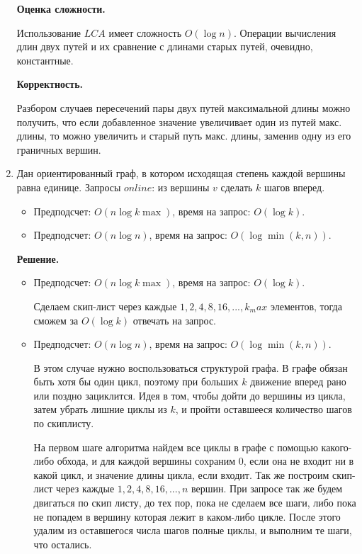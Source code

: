 \begin{enumerate}
	\textbf{Оценка сложности.} 
	
	Использование $LCA$ имеет сложность $O(\log n)$. Операции вычисления длин двух путей и их 
	сравнение с длинами старых путей, очевидно, константные.
	
	\textbf{Корректность.} 
	
	Разбором случаев пересечений пары двух путей максимальной длины можно получить, что если
	добавленное значение увеличивает один из путей макс. длины, то можно увеличить и старый путь макс.
	длины, заменив одну из его граничных вершин. 
	
	\item Дан ориентированный граф, в котором исходящая степень каждой вершины равна единице.
	Запросы $online$: из вершины $v$ сделать $k$ шагов вперед.
	\begin{itemize}
		\item Предподсчет: $O(n \log k\max)$, время на запрос: $O(\log k)$.
		\item Предподсчет: $O(n \log n)$, время на запрос: $O(\log \min(k, n))$.
	\end{itemize}
	
	\textbf{Решение.}
	
	\begin{itemize}
		\item Предподсчет: $O(n \log k\max)$, время на запрос: $O(\log k)$.
		
		Сделаем скип-лист через каждые $1, 2, 4, 8, 16, ..., k_max$ элементов, тогда сможем за $O(\log k)$ 
		отвечать на запрос.
		\item Предподсчет: $O(n \log n)$, время на запрос: $O(\log \min(k, n))$.
		
		В этом случае нужно воспользоваться структурой графа. В графе обязан быть хотя бы один 
		цикл, поэтому при больших $k$ движение вперед рано или поздно зациклится. Идея в том, 
		чтобы дойти до вершины из цикла, затем убрать лишние циклы из $k$, и пройти оставшееся 
		количество шагов по скиплисту.
		
		На первом шаге алгоритма найдем все циклы в графе с помощью какого-либо обхода, и для 
		каждой вершины сохраним 0, если она не входит ни в какой цикл, и значение длины цикла, 
		если входит. Так же построим скип-лист через каждые $1, 2, 4, 8, 16, ..., n$ вершин. 
		При запросе так же будем двигаться по скип листу, до тех пор, пока не сделаем все шаги, 
		либо пока не попадем в вершину которая лежит в каком-либо цикле. После этого удалим из 
		оставшегося числа шагов полные циклы, и выполним те шаги, что остались. 
		

\end{itemize}
\end{enumerate}
